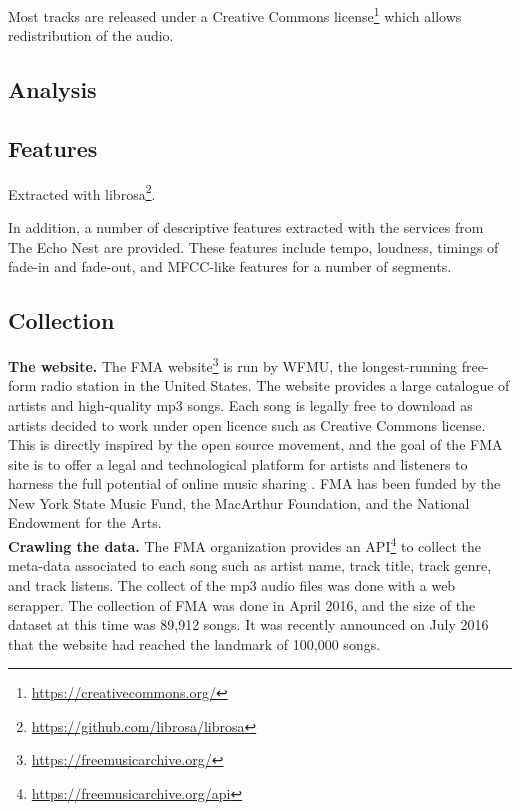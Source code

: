 \documentclass{article}
\begin{document}

Most tracks are released under a Creative Commons license\footnote{\url{https://creativecommons.org/}} which allows redistribution of the audio.

\subsection{Analysis}

\subsection{Features} %

Extracted with librosa\footnote{\url{https://github.com/librosa/librosa}}.

In addition, a number of descriptive features extracted with the services from The Echo Nest are provided. These features include tempo, loudness, timings of fade-in and fade-out, and MFCC-like features for a number of segments.

\subsection{Collection} %

\noindent
{\bf The website.} The FMA website\footnote{\url{https://freemusicarchive.org/}} is run by WFMU, the longest-running free-form radio station in the United States. The website provides a large catalogue of artists and high-quality mp3 songs. Each song is legally free to download as artists decided to work under open licence such as Creative Commons license. This is directly inspired by the open source movement, and the goal of the FMA site is to offer a legal and technological platform for artists and listeners to harness the full potential of online music sharing \cite{art:MossFMA}. FMA has been funded by the New York State Music Fund, the MacArthur Foundation, and the National Endowment for the Arts.\\



\noindent
{\bf Crawling the data.} The FMA organization provides an API\footnote{\url{https://freemusicarchive.org/api}} to collect the meta-data associated to each song such as artist name, track title, track genre, and track listens. The collect of the mp3 audio files was done with a web scrapper. The collection of FMA was done in April 2016, and the size of the dataset at this time was 89,912 songs. It was recently announced on July 2016 that the website had reached the landmark of 100,000 songs. \\
\end{document}
